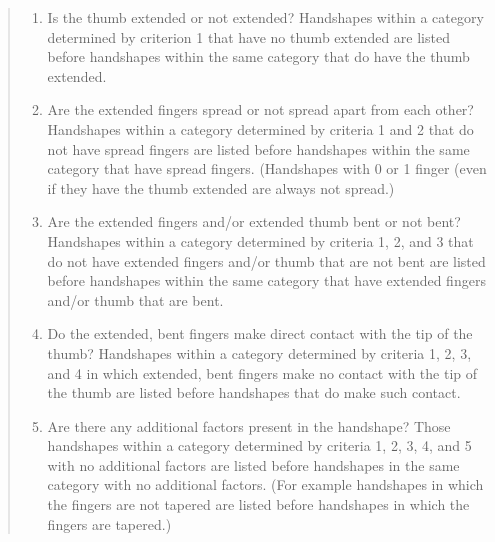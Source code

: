 \documentclass{tufte-book}
\begin{document}
\begin{fullwidth}
\begin{quote}
\begin{enumerate}
\item Is the thumb extended or not extended? Handshapes within a category determined by criterion 1 that have no thumb extended are listed before handshapes within the same category that do have the thumb extended.

\item Are the extended fingers spread or not spread apart from each other? Handshapes within a category determined by criteria 1 and 2 that do not have spread fingers are listed before handshapes within the same category that have spread fingers. (Handshapes with 0 or 1 finger (even if they have the thumb extended are always not spread.)

\item Are the extended fingers and/or extended thumb bent or not bent? Handshapes within a category determined by criteria 1, 2, and 3 that do not have extended fingers and/or thumb that are not bent are listed before handshapes within the same category that have extended fingers and/or thumb that are bent.

\item Do the extended, bent fingers make direct contact with the tip of the thumb? Handshapes within a category determined by criteria 1, 2, 3, and 4 in which
extended, bent fingers make no contact with the tip of the thumb are listed before handshapes that do make such contact.

\item Are there any additional factors present in the handshape? Those handshapes within a category determined by criteria 1, 2, 3, 4, and 5 with no additional factors are listed before handshapes in the same category with no additional factors. (For example handshapes in which the fingers are not tapered are listed before handshapes in which the fingers are tapered.)
\end{enumerate}
\end{quote}


\end{fullwidth}
\end{document}
